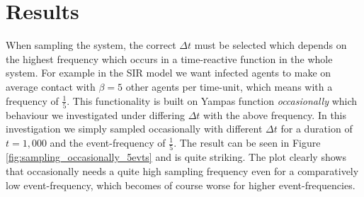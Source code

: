 \section{Results}

When sampling the system, the correct $\Delta t$ must be selected which depends on the highest frequency which occurs in a time-reactive function in the whole system. For example in the SIR model we want infected agents to make on average contact with $\beta = 5$ other agents per time-unit, which means with a frequency of $\frac{1}{5}$. This functionality is built on Yampas function \textit{occasionally} which behaviour we investigated under differing $\Delta t$ with the above frequency. In this investigation we simply sampled occasionally with different $\Delta t$ for a duration of $t = 1,000$ and the event-frequency of $\frac{1}{5}$. The result can be seen in Figure \ref{fig:sampling_occasionally_5evts} and is quite striking. The plot clearly shows that occasionally needs a quite high sampling frequency even for a comparatively low event-frequency, which becomes of course worse for higher event-frequencies.

